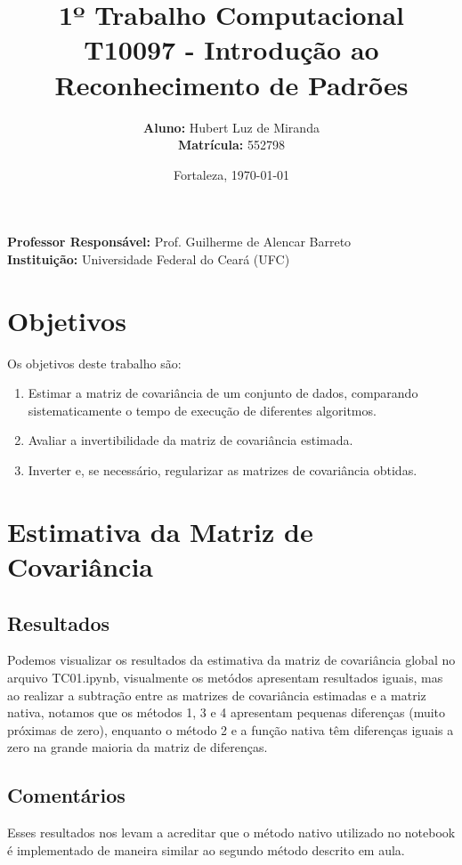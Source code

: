 \documentclass[a4paper, 12pt]{article}
\title{
    \textbf{1º Trabalho Computacional} \\
    \large T10097 - Introdução ao Reconhecimento de Padrões
}
\author{
    \textbf{Aluno:} Hubert Luz de Miranda \\
    \textbf{Matrícula:} 552798
}
\date{Fortaleza, \today}
\begin{document}
\maketitle 

\begin{center}
    \textbf{Professor Responsável:} Prof. Guilherme de Alencar Barreto  \\
    \textbf{Instituição:} Universidade Federal do Ceará (UFC) 
\end{center}

\newpage

\section*{Objetivos}
Os objetivos deste trabalho são:
\begin{enumerate}
    \item Estimar a matriz de covariância de um conjunto de dados, comparando sistematicamente o tempo de execução de diferentes algoritmos.
    \item Avaliar a invertibilidade da matriz de covariância estimada.
    \item Inverter e, se necessário, regularizar as matrizes de covariância obtidas.
\end{enumerate}

\section{Estimativa da Matriz de Covariância}

\subsection{Resultados}
Podemos visualizar os resultados da estimativa da matriz de covariância global no arquivo TC01.ipynb, visualmente os metódos apresentam
resultados iguais, mas ao realizar a subtração entre as matrizes de covariância estimadas e a matriz nativa, notamos que os métodos 1, 3 e 4
apresentam pequenas diferenças (muito próximas de zero), enquanto o método 2 e a função nativa têm diferenças iguais a zero na grande maioria
da matriz de diferenças.

\subsection{Comentários}
Esses resultados nos levam a acreditar que o método nativo utilizado no notebook é implementado de maneira similar ao segundo
método descrito em aula.
\end{document}
